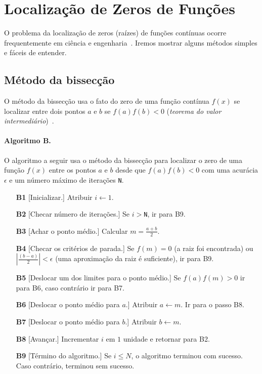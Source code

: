 \section*{Localização de Zeros de Funções}

O problema da localização de zeros (raízes) 
de funções contínuas ocorre frequentemente 
em ciência e engenharia~\cite{hamming}.
Iremos mostrar alguns métodos simples 
e fáceis de entender.

\subsection*{Método da bissecção}

O método da bissecção usa o fato do zero de uma 
função contínua $f(x)$ se localizar entre dois 
pontos $a$ e $b$ se $f(a)f(b)<0$ 
({\it teorema do valor intermediário\/})~\cite{numrec}.

\paragraph{Algoritmo B.}
O algoritmo a seguir usa o método da bissecção para 
localizar o zero de uma função $f(x)$ 
entre os pontos $a$ e $b$ desde que $f(a)f(b)<0$ 
com uma acurácia $\epsilon$ e um número máximo 
de iterações {\tt N}.

\begin{itemize}
\item[\bf B1] [Inicializar.] Atribuir $i \leftarrow 1$.
\item[\bf B2] [Checar número de iterações.] Se $i>${\tt N}, 
		ir para B9.

	\item[\bf B3] [Achar o ponto médio.] Calcular $m = \frac{a+b}{2}$.

\item[\bf B4] [Checar os critérios de parada.] Se $f(m)=0$
	(a raiz foi encontrada)
		ou \hbox{$|\frac{(b-a)}{2}| < \epsilon$} (uma aproximação da
	raiz é suficiente), ir para B9.

\item[\bf B5] [Deslocar um dos limites para o ponto médio.]
	Se $f(a)f(m)>0$ ir para B6, caso contrário 
	ir para B7.

\item[\bf B6] [Deslocar o ponto médio para $a$.] Atribuir
	$a\leftarrow m$. Ir para o passo B8.

\item[\bf B7] [Deslocar o ponto médio para $b$.] Atribuir
	$b\leftarrow m$.

\item[\bf B8] [Avançar.] Incrementar $i$ em $1$ unidade e
	retornar para B2.

\item[\bf B9] [Término do algoritmo.] Se $i\leq N$, o algoritmo
	terminou com sucesso. Caso contrário, terminou 
	sem sucesso.\quad\pfbox
\end{itemize}


